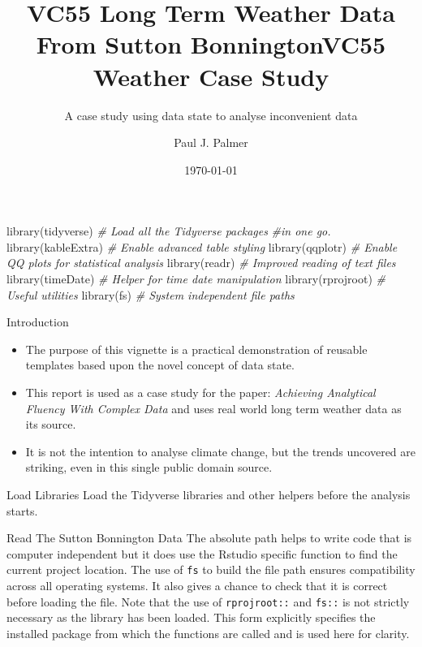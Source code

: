 \documentclass[
  ignorenonframetext,
]{beamer}
\title[ VC55 Weather Case Study]{VC55 Long Term Weather Data From Sutton Bonnington} %
\subtitle{A case study using data state to analyse inconvenient data}
\institute[LU] %
{
    Visiting Fellow \\
    Loughborough University \\
    \copyright~P.J.~Palmer~2022
    
    
    
}
\author{}
\date{\vspace{-2.5em}\today} %
\title{VC55 Weather Case Study}
\author{Paul J. Palmer}
\date{}
\newenvironment{Shaded}{\begin{snugshade}}{\end{snugshade}}
\newcommand{\CommentTok}[1]{\textcolor[rgb]{0.56,0.35,0.01}{\textit{#1}}}
\newcommand{\FunctionTok}[1]{\textcolor[rgb]{0.00,0.00,0.00}{#1}}
\newcommand{\NormalTok}[1]{#1}
\providecommand{\tightlist}{%
  \setlength{\itemsep}{0pt}\setlength{\parskip}{0pt}}
\begin{document}
\frame{\titlepage}

\begin{frame}[fragile]
\begin{Shaded}
\begin{Highlighting}[]
\FunctionTok{library}\NormalTok{(tidyverse) }\CommentTok{\# Load all the Tidyverse packages }
\CommentTok{\#in one go.}
\FunctionTok{library}\NormalTok{(kableExtra) }\CommentTok{\# Enable advanced table styling}
\FunctionTok{library}\NormalTok{(qqplotr) }\CommentTok{\# Enable QQ plots for statistical analysis}
\FunctionTok{library}\NormalTok{(readr) }\CommentTok{\# Improved reading of text files}
\FunctionTok{library}\NormalTok{(timeDate) }\CommentTok{\# Helper for time date manipulation}
\FunctionTok{library}\NormalTok{(rprojroot) }\CommentTok{\# Useful utilities}
\FunctionTok{library}\NormalTok{(fs) }\CommentTok{\# System independent file paths}
\end{Highlighting}
\end{Shaded}
\end{frame}

\begin{frame}{Introduction}
\protect\hypertarget{introduction}{}
\begin{itemize}
\tightlist
\item
  The purpose of this vignette is a practical demonstration of reusable
  templates based upon the novel concept of data state.
\item
  This report is used as a case study for the paper: \emph{Achieving
  Analytical Fluency With Complex Data} and uses real world long term
  weather data as its source.
\item
  It is not the intention to analyse climate change, but the trends
  uncovered are striking, even in this single public domain source.
\end{itemize}
\end{frame}

\begin{frame}{Load Libraries}
\protect\hypertarget{load-libraries}{}
Load the Tidyverse libraries and other helpers before the analysis
starts.
\end{frame}

\begin{frame}[fragile]{Read The Sutton Bonnington Data}
\protect\hypertarget{read-the-sutton-bonnington-data}{}
The absolute path helps to write code that is computer independent but
it does use the Rstudio specific function to find the current project
location. The use of \texttt{fs} to build the file path ensures
compatibility across all operating systems. It also gives a chance to
check that it is correct before loading the file. Note that the use of
\texttt{rprojroot::} and \texttt{fs::} is not strictly necessary as the
library has been loaded. This form explicitly specifies the installed
package from which the functions are called and is used here for
clarity.
\end{frame}
\end{document}
